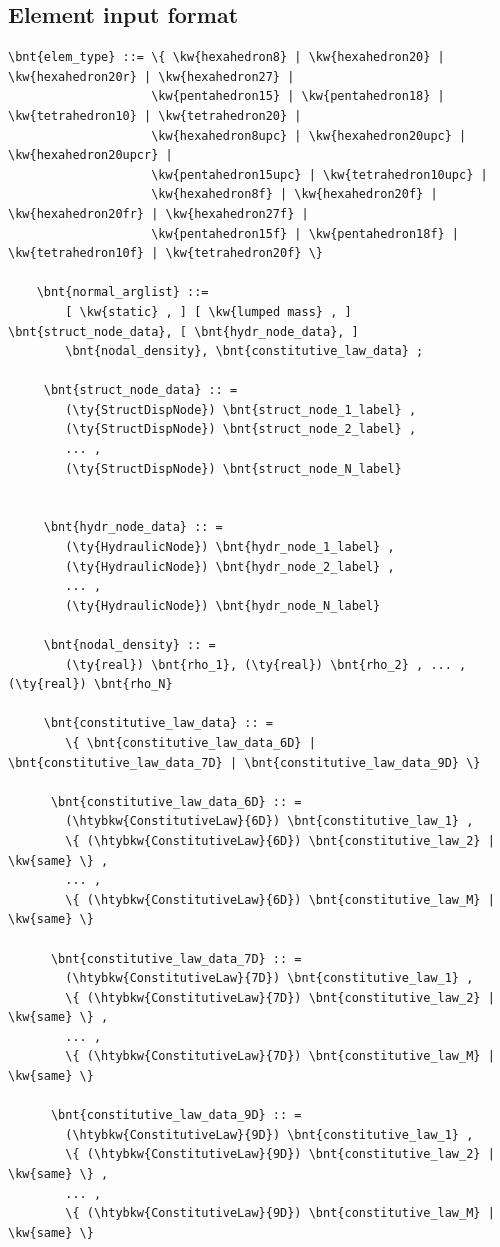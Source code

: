 \subsection{Element input format}
\label{sec:EL:SOLID:INPUT:FORMAT}
\begin{Verbatim}[commandchars=\\\{\}]
  \bnt{elem_type} ::= \{ \kw{hexahedron8} | \kw{hexahedron20} | \kw{hexahedron20r} | \kw{hexahedron27} |
                    \kw{pentahedron15} | \kw{pentahedron18} | \kw{tetrahedron10} | \kw{tetrahedron20} |
                    \kw{hexahedron8upc} | \kw{hexahedron20upc} | \kw{hexahedron20upcr} |
                    \kw{pentahedron15upc} | \kw{tetrahedron10upc} |
                    \kw{hexahedron8f} | \kw{hexahedron20f} | \kw{hexahedron20fr} | \kw{hexahedron27f} |
                    \kw{pentahedron15f} | \kw{pentahedron18f} | \kw{tetrahedron10f} | \kw{tetrahedron20f} \}

    \bnt{normal_arglist} ::=
        [ \kw{static} , ] [ \kw{lumped mass} , ] \bnt{struct_node_data}, [ \bnt{hydr_node_data}, ]
        \bnt{nodal_density}, \bnt{constitutive_law_data} ;

     \bnt{struct_node_data} :: =
        (\ty{StructDispNode}) \bnt{struct_node_1_label} ,
        (\ty{StructDispNode}) \bnt{struct_node_2_label} ,
        ... ,
        (\ty{StructDispNode}) \bnt{struct_node_N_label}


     \bnt{hydr_node_data} :: =
        (\ty{HydraulicNode}) \bnt{hydr_node_1_label} ,
        (\ty{HydraulicNode}) \bnt{hydr_node_2_label} ,
        ... ,
        (\ty{HydraulicNode}) \bnt{hydr_node_N_label}

     \bnt{nodal_density} :: =
        (\ty{real}) \bnt{rho_1}, (\ty{real}) \bnt{rho_2} , ... , (\ty{real}) \bnt{rho_N}

     \bnt{constitutive_law_data} :: =
        \{ \bnt{constitutive_law_data_6D} | \bnt{constitutive_law_data_7D} | \bnt{constitutive_law_data_9D} \}

      \bnt{constitutive_law_data_6D} :: =
        (\htybkw{ConstitutiveLaw}{6D}) \bnt{constitutive_law_1} ,
        \{ (\htybkw{ConstitutiveLaw}{6D}) \bnt{constitutive_law_2} | \kw{same} \} ,
        ... ,
        \{ (\htybkw{ConstitutiveLaw}{6D}) \bnt{constitutive_law_M} | \kw{same} \}

      \bnt{constitutive_law_data_7D} :: =
        (\htybkw{ConstitutiveLaw}{7D}) \bnt{constitutive_law_1} ,
        \{ (\htybkw{ConstitutiveLaw}{7D}) \bnt{constitutive_law_2} | \kw{same} \} ,
        ... ,
        \{ (\htybkw{ConstitutiveLaw}{7D}) \bnt{constitutive_law_M} | \kw{same} \}

      \bnt{constitutive_law_data_9D} :: =
        (\htybkw{ConstitutiveLaw}{9D}) \bnt{constitutive_law_1} ,
        \{ (\htybkw{ConstitutiveLaw}{9D}) \bnt{constitutive_law_2} | \kw{same} \} ,
        ... ,
        \{ (\htybkw{ConstitutiveLaw}{9D}) \bnt{constitutive_law_M} | \kw{same} \}
\end{Verbatim}

